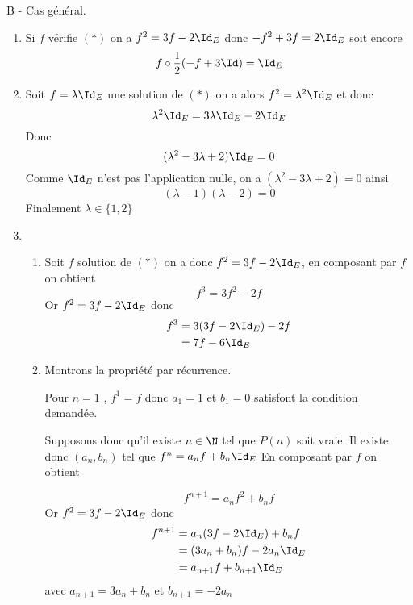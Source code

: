 \begin{correction}
\begin{enumerate}
\end{enumerate}
B - Cas général. 
\begin{enumerate}
\item Si $f$ vérifie $(*)$ on a 
$f^2 = 3f- 2\Id_E$ donc $-f^2+3f =2\Id_E$ soit encore 
$$f\circ \frac{1}{2}(-f +3\Id) = \Id_E$$

\item Soit $f =\lambda \Id_E$ une solution de $(*)$ on a alors 
$f^2 = \lambda^2 \Id_E$   et donc 
$$\lambda^2 \Id_E = 3\lambda  \Id_E - 2\Id_E$$
Donc $$(\lambda^2 - 3\lambda +2) \Id_E =0$$
Comme $\Id_E$ n'est pas l'application nulle, on a $(\lambda^2 - 3\lambda +2)=0$ ainsi 
$$(\lambda -1) (\lambda -2) =0$$
 Finalement $\lambda \in \{1,2\}$
 
 
 \item \begin{enumerate}
 \item Soit $f$ solution   de $(*)$ on a donc $f^2 =3f-2\Id_E$, en composant par $f$ on obtient 
 $$f^3 =3f^2 -2f$$
 Or $f^2 =3f-2\Id_E$ donc 
\begin{align*}
f^3 &= 3 (3f-2\Id_E) -2f \\
		&= 7f -6\Id_E
\end{align*}


\item Montrons la propriété par récurrence. 

Pour $n=1$ ,  $f^1 =f$ donc $a_1 =1 $ et $b_1 =0$ satisfont la condition demandée. 

Supposons donc qu'il existe $n\in \N$ tel que $P(n) $ soit vraie. Il existe donc $(a_n,b_n)$ tel que 
$f^n =a_n f +b_n \Id_E$
En composant par $f$ on obtient 

$$f^{n+1} =a_n f^2 +b_n f$$
 Or $f^2 =3f-2\Id_E$ donc 
\begin{align*}
f^{n+1}  &= a_n (3f-2\Id_E) +b_nf  \\
		&= (3a_n +b_n) f -2a_n\Id_E\\
		&=a_{n+1} f +b_{n+1}\Id_E\\
\end{align*}
avec $a_{n+1} = 3a_n +b_n$ et $b_{n+1} = -2a_n$







\end{enumerate}
\end{enumerate}
\end{correction}
